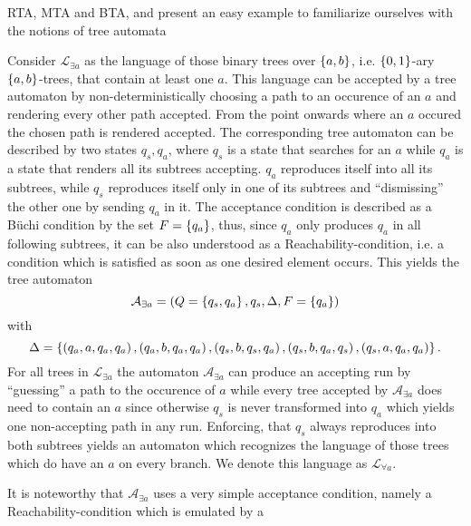 \ac{RTA}, \ac{MTA} and \ac{BTA}, and present an easy example to familiarize
ourselves with the notions of tree automata
\begin{example}
  Consider $\mathcal{L}_{\exists a}$ as the language of those binary trees over 
  $\left\{a,b\right\}$, i.e. $\left\{0,1\right\}$-ary $\left\{a,b\right\}$-trees, that contain at least 
  one $a$. This language can be accepted by a tree automaton by 
  non-deterministically choosing a path to an occurence of an $a$ and rendering 
  every other path accepted. From the point onwards where an $a$ occured the
  chosen path is rendered accepted. The corresponding tree automaton can be 
  described by two states $q_{s}, q_{a}$, where $q_{s}$ is a state that 
  searches for an $a$ while $q_{a}$ is a state that renders all its subtrees 
  accepting. $q_{a}$ reproduces itself into all its subtrees, while $q_{s}$ 
  reproduces itself only in one of its subtrees and \enquote{dismissing} the 
  other one by sending $q_{a}$ in it. The acceptance condition is described as 
  a Büchi condition by the set $F = \left\{q_{a}\right\}$, thus, since $q_{a}$ only 
  produces $q_{a}$ in all following subtrees, it can be also understood as a 
  Reachability-condition, i.e. a condition which is satisfied as soon as one
  desired element occurs. This yields the tree automaton
  \begin{equation*}
    \mathcal{A}_{\exists a} = \left(Q = \left\{q_{s}, q_{a}\right\}, q_{s},
    \Delta ,F = \left\{q_{a}\right\}\right)
  \end{equation*}
  with
  \begin{equation*}
    \Delta = \left\{\left(q_{a}, a, q_{a}, q_{a}\right),\left(q_{a}, b, q_{a}, q_{a}\right),
      \left(q_{s}, b, q_{s}, q_{a}\right), \left(q_{s}, b, q_{a}, q_{s}\right),
      \left(q_{s}, a, q_{a}, q_{a}\right)\right\}.
  \end{equation*}
  For all trees in $\mathcal{L}_{\exists a}$ the automaton
  $\mathcal{A}_{\exists a}$ can produce an accepting run by \enquote{guessing}
  a path to the occurence of $a$ while every tree accepted by
  $\mathcal{A}_{\exists a}$ does need to contain an $a$ since otherwise $q_{s}$
  is never transformed into $q_{a}$ which yields one non-accepting path in any
  run. Enforcing, that $q_{s}$ always reproduces into both subtrees yields an
  automaton which recognizes the language of those trees which do have an $a$
  on every branch. We denote this language as $\mathcal{L}_{\forall a}$.
  \label{ex:treeexa}
\end{example}
It is noteworthy that $\mathcal{A}_{\exists a}$ uses a very simple acceptance
condition, namely a Reachability-condition which is emulated by a 
